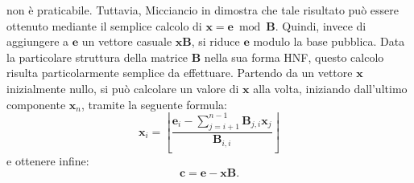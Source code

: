 non è praticabile. Tuttavia, Micciancio in \cite[Sezione 4.1]{HNF01} dimostra che tale 
risultato può essere ottenuto mediante il semplice calcolo di 
$\mathbf{x} = \mathbf{e} \bmod \mathbf{B}$. Quindi, invece di aggiungere a $\mathbf{e}$ un
vettore casuale $\mathbf{x}\mathbf{B}$, si riduce $\mathbf{e}$ modulo la base pubblica.
Data la particolare struttura della matrice 
$\mathbf{B}$ nella sua forma HNF, questo calcolo risulta particolarmente 
semplice da effettuare. Partendo da un vettore $\mathbf{x}$
inizialmente nullo, si può calcolare un valore di $\mathbf{x}$ alla volta, iniziando dall'ultimo
componente $\mathbf{x}_n$, tramite la seguente formula:
\begin{equation}
    \label{eq:HNFreduction}
    \mathbf{x}_i = \left\lfloor \frac{\mathbf{e}_i - 
    \sum_{j=i+1}^{n-1} \mathbf{B}_{j,i} \mathbf{x}_j}{\mathbf{B}_{i,i}} \right\rfloor
\end{equation}
e ottenere infine:
\begin{equation}
    \label{eq:HNFencryption}
    \mathbf{c} = \mathbf{e} - \mathbf{x}\mathbf{B}.
\end{equation}

